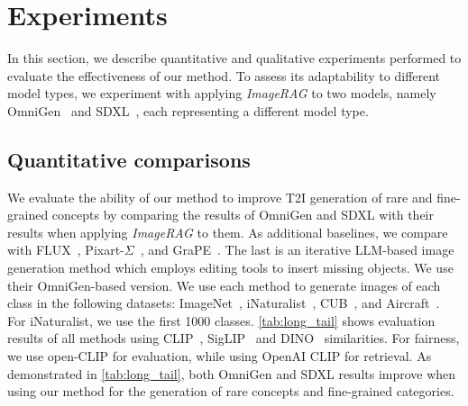 \vspace{-4pt}
\section{Experiments}
\label{sec:experiments}

In this section, we describe quantitative and qualitative experiments performed to evaluate the effectiveness of our method. To assess its adaptability to different model types, we experiment with applying \emph{ImageRAG} to two models, namely OmniGen~\cite{xiao2024omnigen} and SDXL~\cite{podellsdxl}, each representing a different model type.

\vspace{-1pt}
\subsection{Quantitative comparisons}
\label{sec:quant}

We evaluate the ability of our method to improve T2I generation of rare and fine-grained concepts by comparing the results of OmniGen and SDXL with their results when applying \emph{ImageRAG} to them.
As additional baselines, we compare with FLUX~\cite{flux2023}, Pixart-$\Sigma$~\cite{chen2025pixart}, and GraPE~\cite{goswami2024grape}. The last is an iterative LLM-based image generation method which employs editing tools to insert missing objects. We use their OmniGen-based version.
We use each method to generate images of each class in the following datasets: ImageNet~\cite{deng2009imagenet}, iNaturalist~\cite{van2018inaturalist}, CUB~\cite{wah2011caltech}, and Aircraft~\cite{majifine}.
For iNaturalist, we use the first 1000 classes.
\cref{tab:long_tail} shows evaluation results of all methods using CLIP~\cite{radford2021learning}, SigLIP~\cite{zhai2023sigmoid} and DINO~\cite{zhangdino} similarities. For fairness, we use open-CLIP for evaluation, while using OpenAI CLIP for retrieval.
As demonstrated in \cref{tab:long_tail}, both OmniGen and SDXL results improve when using our method for the generation of rare concepts and fine-grained categories.

\vspace{-3pt}
